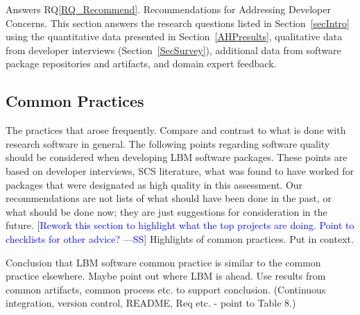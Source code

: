 \documentclass[final, 3p, times, authoryear]{elsarticle}
\newcommand{\authornote}[3]{\textcolor{#1}{[#3 ---#2]}}
\newcommand{\authornote}[3]{}
\newcommand{\wss}[1]{\authornote{blue}{SS}{#1}} %
\newcommand{\rqref}[1]{RQ\ref{#1}}
\begin{document}
Answers \rqref{RQ_Recommend}.  Recommendations for Addressing Developer
Concerns.  This section answers the research questions listed in
Section~\ref{secIntro} using the quantitative data presented in
Section~\ref{AHPresults}, qualitative data from developer interviews
(Section~\ref{SecSurvey}), additional data from software package repositories
and artifacts, and domain expert feedback.

\subsection{Common Practices} \label{currentPractices}

The practices that arose frequently.  Compare and contrast to what is done with
research software in general.  The following points regarding software quality
should be considered when developing LBM software packages. These points are
based on developer interviews, SCS literature, what was found to have worked for
packages that were designated as high quality in this assessment.  Our
recommendations are not lists of what should have been done in the past, or what
should be done now; they are just suggestions for consideration in the future.
\wss{Rework this section to highlight what the top projects are doing.  Point to
checklists for other advice?}  Highlights of common practices.  Put in context.

Conclusion that LBM software common practice is similar to the common practice
elsewhere.  Maybe point out where LBM is ahead.  Use results from common
artifacts, common process etc. to support conclusion.  (Continuous integration,
version control, README, Req etc. - point to Table 8.)
\end{document}
